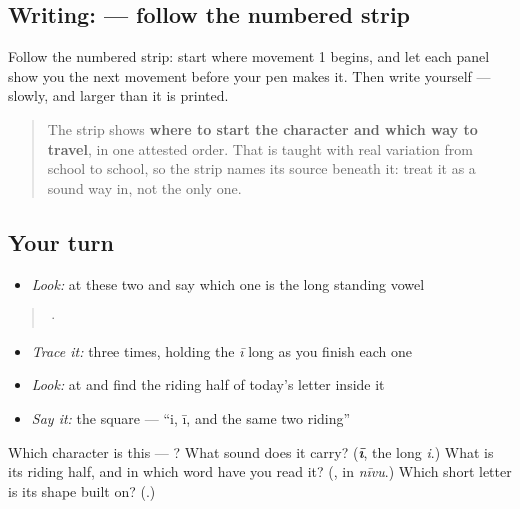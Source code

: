 \subsection*{Writing:  — follow the numbered strip}

Follow the numbered strip: start where movement 1 begins, and let each panel show you the next movement before your pen makes it. Then write  yourself — slowly, and larger than it is printed.

\begin{quote}
The strip shows \textbf{where to start the character and which way to travel}, in one attested order. That is taught with real variation from school to school, so the strip names its source beneath it: treat it as a sound way in, not the only one.
\end{quote}

\subsection*{Your turn}
\begin{itemize}
\raggedright
  \item \emph{Look:} at these two and say which one is the long standing vowel
\end{itemize}

\begin{quote}
  ·  
\end{quote}

\begin{itemize}
\raggedright
  \item \emph{Trace it:}  three times, holding the \emph{ī} long as you finish each one
  \item \emph{Look:} at  and find the riding half of today's letter inside it
  \item \emph{Say it:} the square — \textquotedblleft{}i, ī, and the same two riding\textquotedblright{}
\end{itemize}

\begin{tcolorbox}[breakable,colback=teal!4,colframe=teal!35!black,title={Before you move on}]
Which character is this — ? What sound does it carry? (\emph{\textbf{ī}}, the long \emph{i}.) What is its riding half, and in which word have you read it? (\textbf{}, in \emph{nīvu}.) Which short letter is its shape built on? (\textbf{}.)
\end{tcolorbox}

